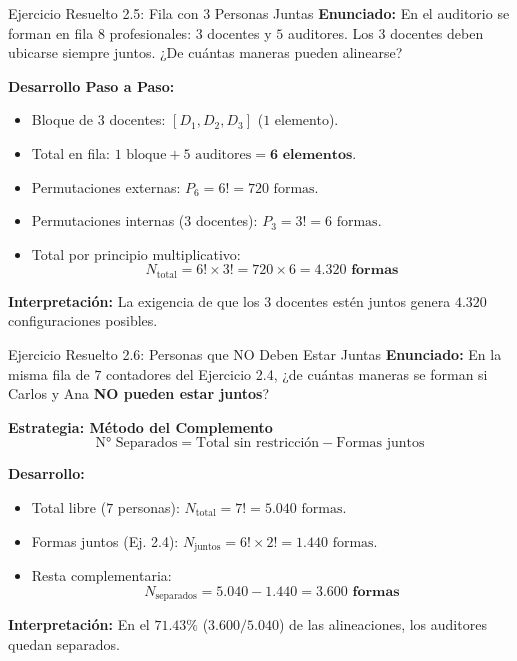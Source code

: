 \documentclass[10pt]{beamer}
\begin{document}
\begin{frame}{Ejercicio Resuelto 2.5: Fila con 3 Personas Juntas}
  \textbf{Enunciado:} En el auditorio se forman en fila $8$ profesionales: $3$ docentes y $5$ auditores. Los $3$ docentes deben ubicarse siempre juntos. ¿De cuántas maneras pueden alinearse?

  \vspace{0.1cm}
  \textbf{Desarrollo Paso a Paso:}
  \begin{itemize}
    \item Bloque de $3$ docentes: $[D_1, D_2, D_3]$ ($1$ elemento).
    \item Total en fila: $1 \text{ bloque} + 5 \text{ auditores} = \mathbf{6 \text{ elementos}}$.
    \item Permutaciones externas: $P_6 = 6! = 720 \text{ formas}$.
    \item Permutaciones internas ($3$ docentes): $P_3 = 3! = 6 \text{ formas}$.
    \item Total por principio multiplicativo:
    $$N_{\text{total}} = 6! \times 3! = 720 \times 6 = \mathbf{4.320 \text{ formas}}$$
  \end{itemize}

  \textbf{Interpretación:} La exigencia de que los 3 docentes estén juntos genera $4.320$ configuraciones posibles.
\end{frame}

\begin{frame}{Ejercicio Resuelto 2.6: Personas que NO Deben Estar Juntas}
  \textbf{Enunciado:} En la misma fila de $7$ contadores del Ejercicio 2.4, ¿de cuántas maneras se forman si Carlos y Ana \textbf{NO pueden estar juntos}?

  \vspace{0.1cm}
  \textbf{Estrategia: Método del Complemento}
  $$\text{N° Separados} = \text{Total sin restricción} - \text{Formas juntos}$$

  \vspace{0.08cm}
  \textbf{Desarrollo:}
  \begin{itemize}
    \item Total libre ($7$ personas): $N_{\text{total}} = 7! = 5.040 \text{ formas}$.
    \item Formas juntos (Ej. 2.4): $N_{\text{juntos}} = 6! \times 2! = 1.440 \text{ formas}$.
    \item Resta complementaria:
    $$N_{\text{separados}} = 5.040 - 1.440 = \mathbf{3.600 \text{ formas}}$$
  \end{itemize}

  \textbf{Interpretación:} En el $71.43\%$ ($3.600/5.040$) de las alineaciones, los auditores quedan separados.
\end{frame}
\end{document}
